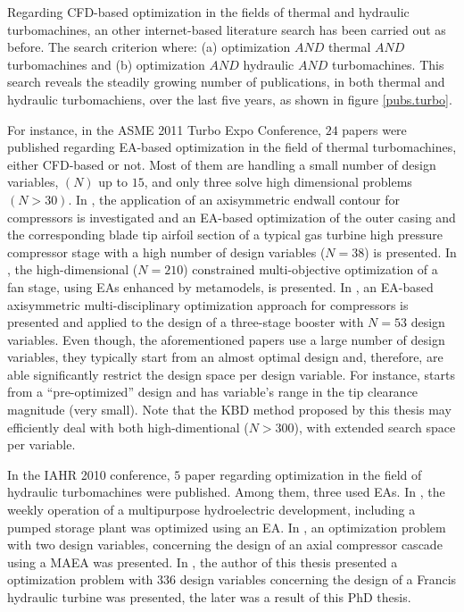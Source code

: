 Regarding CFD-based optimization in the fields of thermal and hydraulic turbomachines, an other internet-based literature search has been carried out as before. The search criterion where: (a) optimization $AND$ thermal $AND$ turbomachines and (b) optimization $AND$ hydraulic $AND$ turbomachines. This search reveals the steadily growing number of publications, in both thermal and hydraulic turbomachiens, over the last five years, as shown in figure \ref{pubs.turbo}. 

For instance, in the ASME 2011 Turbo Expo Conference, $24$ papers were published regarding EA-based optimization in the field of thermal turbomachines, either CFD-based or not. Most of them are handling a small number of design variables, $(N)$ up to $15$, and only three \cite{Georg2011,Marcel2011,Kevin2011} solve high dimensional problems $(N\!>\!30)$. In \cite{Georg2011}, the application of an axisymmetric endwall contour for compressors is investigated and an EA-based optimization of the outer casing and the corresponding blade tip airfoil section of a typical gas turbine high pressure compressor stage with a high number of design variables ($N\!=\!38$) is presented. In \cite{Marcel2011}, the high-dimensional ($N\!=\!210$) constrained multi-objective optimization of a fan stage, using EAs enhanced by metamodels, is presented. In \cite{Kevin2011}, an EA-based axisymmetric multi-disciplinary optimization approach for compressors is presented and applied to the design of a three-stage booster with $N\!=\!53$ design variables. Even though, the aforementioned papers use a large number of design variables, they typically start from an almost optimal design and, therefore, are able significantly restrict the design space per design variable. For instance,  \cite{Marcel2011} starts from a ``pre-optimized'' design and \cite{Georg2011} has variable's range in the tip clearance magnitude (very small). Note that the KBD method proposed by this thesis may efficiently deal with both high-dimentional ($N\!>\!300$), with extended search space per variable.      

In the IAHR 2010 conference, $5$ paper regarding optimization in the field of hydraulic turbomachines were published. Among them, three \cite{Raimunda2010,Kyriacou2010,Popa2010} used EAs. In \cite{Popa2010}, the weekly operation of a multipurpose
hydroelectric development, including a pumped storage plant was optimized using an EA. In \cite{Raimunda2010}, an optimization problem with two design variables, concerning the design of an axial compressor cascade using a MAEA was presented.  In \cite{Kyriacou2010}, the author of this thesis presented  a optimization problem with $336$ design variables concerning the design of a Francis hydraulic turbine was presented, the later was a result of this PhD thesis. 


